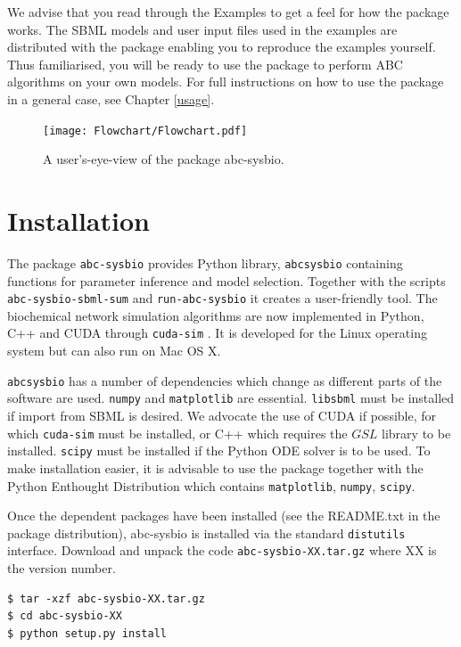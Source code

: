 \documentclass[a4paper]{report}
\begin{document}
We advise that you read through the Examples to get a feel for how the package works. The SBML models and user input files used in the examples are distributed with the package enabling you to reproduce the examples yourself. Thus familiarised, you will be ready to use the package to perform ABC  algorithms on your own models. For full instructions on how to use the package in a general case, see Chapter \ref{usage}.
\begin{figure}[p]
\begin{center}
\texttt{[image: Flowchart/Flowchart.pdf]}
\caption{A user's-eye-view of the package abc-sysbio. \label{Flowchart}}
\end{center}
\end{figure}


\chapter{Installation}
The package \verb$abc-sysbio$ provides Python library, \verb$abcsysbio$ containing functions for parameter inference and model selection. Together with the scripts \verb$abc-sysbio-sbml-sum$ and \verb$run-abc-sysbio$ it creates a user-friendly tool. The biochemical network simulation algorithms are now implemented in Python, C++ and CUDA through \verb$cuda-sim$ \citep{zhou2011}.  It is developed for the Linux operating system but can also run on Mac OS X.

\verb$abcsysbio$ has a number of dependencies which change as different parts of the software are used. \verb$numpy$ and \verb$matplotlib$ are essential. \verb$libsbml$ must be installed if import from SBML is desired. We advocate the use of CUDA if possible, for which \verb$cuda-sim$ must be installed, or C++ which requires the $GSL$ library to be installed. \verb$scipy$ must be installed if the Python ODE solver is to be used. To make installation easier, it is advisable to use the package together with the Python Enthought Distribution which contains  \verb$matplotlib$, \verb$numpy$, \verb$scipy$.

Once the dependent packages have been installed (see the README.txt in the package distribution), abc-sysbio is installed via the standard \verb$distutils$ interface. Download and unpack the code \verb$abc-sysbio-XX.tar.gz$ where XX is the version number.
\begin{verbatim}
$ tar -xzf abc-sysbio-XX.tar.gz
$ cd abc-sysbio-XX
$ python setup.py install
\end{verbatim}
\end{document}
